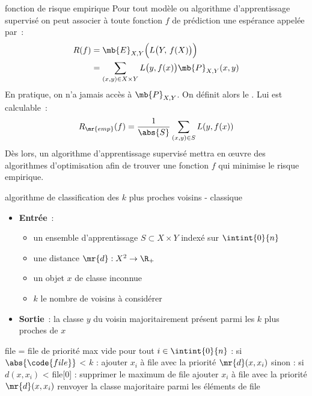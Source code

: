 \begin{adjustwidth}{-3cm}{-3cm}
\begin{definition}{5.5}{fonction de risque empirique}
    Pour tout modèle ou algorithme d'apprentissage supervisé on peut associer à toute fonction $f$ de prédiction une espérance appelée  par~:
    \begin{align*}
        R(f) &= \mb{E}_{X,Y}\Big( L\big( Y,\, f(X) \big) \Big) \\
        &= \sum_{(x,y) \in X\times Y} L \big( y, f(x) \big) \mb{P}_{X,Y}(x,y)
    \end{align*}
    En pratique, on n'a jamais accès à $\mb{P}_{X,Y}$. On définit alors le . Lui est calculable~:
    $$R_\mr{emp}(f) = \frac{1}{\abs{S}} \sum_{(x,y) \in S}L(y,f(x))$$
    Dès lors, un algorithme d'apprentissage supervisé mettra en œuvre des algorithmes d'optimisation afin de trouver une fonction $f$ qui minimise le risque empirique.
\end{definition}

\begin{implementation}{algorithme de classification des $k$ plus proches voisins - classique}
    \begin{itemize}
        \item \textbf{Entrée}~: \begin{itemize}
            \item un ensemble d'apprentissage $S \subset X\times Y$ indexé sur $\intint{0}{n}$
            \item une distance $\mr{d} : X^2 \to \R_+$
            \item un objet $x$ de classe inconnue
            \item $k$ le nombre de voisins à considérer
            
        \end{itemize}
        \item \textbf{Sortie}~: la classe $y$ du voisin majoritairement présent parmi les $k$ plus proches de $x$
    \end{itemize}
    \begin{lstLNat}
    file = file de priorité max vide
    pour tout $i \in \intint{0}{n}$ :
        si $\abs{\code{file}}$ < $k$ :
            ajouter $x_i$ à file avec la priorité $\mr{d}(x,x_i)$
        sinon :
            si $d(x,x_i)$ < file[0] :
                supprimer le maximum de file
                ajouter $x_i$ à file avec la priorité $\mr{d}(x,x_i)$
    renvoyer la classe majoritaire parmi les éléments de file
    \end{lstLNat}
\end{implementation}


\end{adjustwidth}
